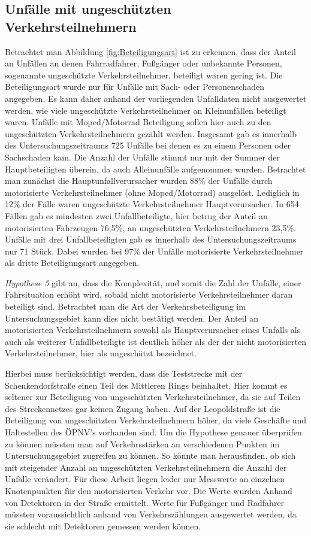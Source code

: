 \subsection{Unfälle mit ungeschützten Verkehrsteilnehmern}
Betrachtet man Abbildung \ref{fig:Beteiligungsart} ist zu erkennen, dass der Anteil an Unfällen an denen Fahrradfahrer, Fußgänger oder unbekannte Personen, sogenannte ungeschützte Verkehrsteilnehmer, beteiligt waren gering ist. Die Beteiligungsart wurde nur für Unfälle mit Sach- oder Personenschaden angegeben. Es kann daher anhand der vorliegenden Unfalldaten nicht ausgewertet werden, wie viele ungeschützte Verkehrsteilnehmer an Kleinunfällen beteiligt waren. Unfälle mit Moped/Motorrad Beteiligung sollen hier auch zu den ungeschützten Verkehrsteilnehmern gezählt werden. Insgesamt gab es innerhalb des Untersuchungszeitraums 725 Unfälle bei denen es zu einem Personen oder Sachschaden kam. Die Anzahl der Unfälle stimmt nur mit der Summer der Hauptbeteiligten überein, da auch Alleinunfälle aufgenommen wurden. Betrachtet man zunächst die Hauptunfallverursacher wurden 88\% der Unfälle durch motorisierte Verkehrsteilnehmer (ohne Moped/Motorrad) ausgelöst. Lediglich in 12\% der Fälle waren ungeschützte Verkehrsteilnehmer Hauptverursacher. In 654 Fällen gab es mindesten zwei Unfallbeteiligte, hier betrug der Anteil an motorisierten Fahrzeugen 76,5\%, an ungeschützten Verkehrsteilnehmern 23,5\%. Unfälle mit drei Unfallbeteiligten gab es innerhalb des Untersuchungszeitraums nur 71 Stück. Dabei wurden bei 97\% der Unfälle motorisierte Verkehrsteilnehmer als dritte Beteiligungsart angegeben.

\textit{Hypothese 5} gibt an, dass die Komplexität, und somit die Zahl der Unfälle, einer Fahrsituation erhöht wird, sobald nicht motorisierte Verkehrsteilnehmer daran beteiligt sind. Betrachtet man die Art der Verkehrsbeteiligung im Untersuchungsgebiet kann dies nicht bestätigt werden. Der Anteil an motorisierten Verkehrsteilnehmern sowohl als Hauptverursacher eines Unfalls als auch als weiterer Unfallbeteiligte ist deutlich höher als der der nicht motorisierten Verkehrsteilnehmer, hier als ungeschützt bezeichnet. 

Hierbei muss berücksichtigt werden, dass die Teststrecke mit der Schenkendorfstraße einen Teil des Mittleren Rings beinhaltet. Hier kommt es seltener zur Beteiligung von ungeschützten Verkehrsteilnehmer, da sie auf Teilen des Streckennetzes gar keinen Zugang haben. Auf der Leopoldstraße ist die Beteiligung von ungeschützten Verkehrsteilnehmern höher, da viele Geschäfte und Haltestellen des ÖPNV's vorhanden sind. Um die Hypothese genauer überprüfen zu können müssten man auf Verkehrsstärken an verschiedenen Punkten im Untersuchungsgebiet zugreifen zu können. So könnte man herausfinden, ob sich mit steigender Anzahl an ungeschützten Verkehrsteilnehmern die Anzahl der Unfälle verändert. Für diese Arbeit liegen leider nur Messwerte an einzelnen Knotenpunkten für den motorisierten Verkehr vor. Die Werte wurden Anhand von Detektoren in der Straße ermittelt. Werte für Fußgänger und Radfahrer müssten voraussichtlich anhand von Verkehrszählungen ausgewertet werden, da sie schlecht mit Detektoren gemessen werden können. %

